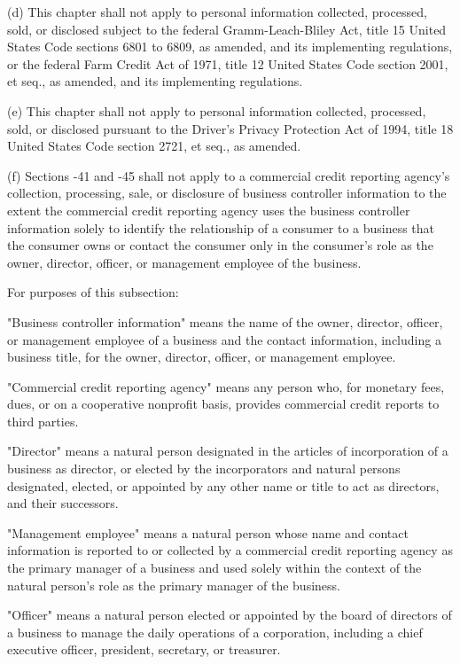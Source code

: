      (d)  This chapter shall not apply to personal information collected, processed, sold, or disclosed subject to the federal Gramm-Leach-Bliley Act, title 15 United States Code sections 6801 to 6809, as amended, and its implementing regulations, or the federal Farm Credit Act of 1971, title 12 United States Code section 2001, et seq., as amended, and its implementing regulations.

     (e)  This chapter shall not apply to personal information collected, processed, sold, or disclosed pursuant to the Driver's Privacy Protection Act of 1994, title 18 United States Code section 2721, et seq., as amended.

     (f)  Sections    -41 and    -45 shall not apply to a commercial credit reporting agency's collection, processing, sale, or disclosure of business controller information to the extent the commercial credit reporting agency uses the business controller information solely to identify the relationship of a consumer to a business that the consumer owns or contact the consumer only in the consumer's role as the owner, director, officer, or management employee of the business.

     For purposes of this subsection:

     "Business controller information" means the name of the owner, director, officer, or management employee of a business and the contact information, including a business title, for the owner, director, officer, or management employee.

     "Commercial credit reporting agency" means any person who, for monetary fees, dues, or on a cooperative nonprofit basis, provides commercial credit reports to third parties.

     "Director" means a natural person designated in the articles of incorporation of a business as director, or elected by the incorporators and natural persons designated, elected, or appointed by any other name or title to act as directors, and their successors.

     "Management employee" means a natural person whose name and contact information is reported to or collected by a commercial credit reporting agency as the primary manager of a business and used solely within the context of the natural person's role as the primary manager of the business.

     "Officer" means a natural person elected or appointed by the board of directors of a business to manage the daily operations of a corporation, including a chief executive officer, president, secretary, or treasurer.

